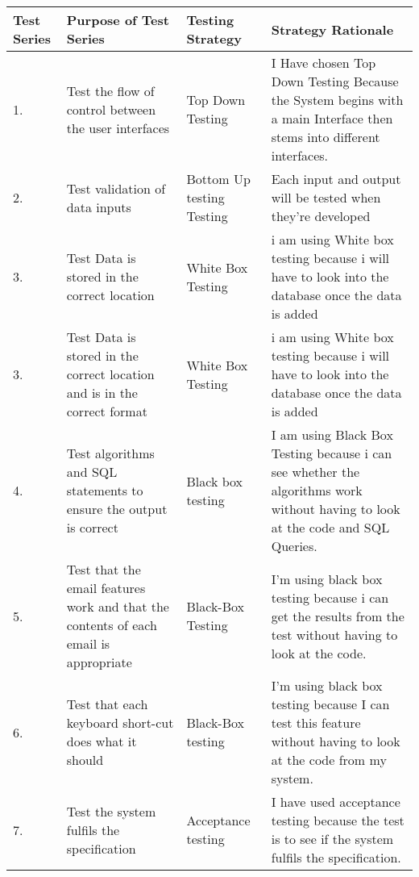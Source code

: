 \begin{landscape}
\begin{center}
    \begin{tabular}{|p{2cm}|p{5cm}|p{5cm}|p{4cm}|}
        \hline
	
	 \textbf{Test Series} & \textbf{Purpose of Test Series} & \textbf{Testing Strategy} & \textbf{Strategy Rationale}\\ \hline
	1. & Test the flow of control between the user interfaces & Top Down Testing & I Have chosen Top Down Testing Because the System begins with a main Interface then stems into different interfaces. \\ \hline
	2. & Test validation of data inputs & Bottom Up testing Testing &  Each input and output will be tested when they're developed\\ \hline
	\rowcolor{dark-grey} 3. & Test Data is stored in the correct location & White Box Testing & i am using White box testing because i will have to look into the database once the data is added \\ \hline
	\rowcolor{light-grey} 3. & Test Data is stored in the correct location and is in the correct format & White Box Testing & i am using White box testing because i will have to look into the database once the data is added \\ \hline
	4. & Test algorithms and SQL statements to ensure the output is correct & Black box testing & I am using Black Box Testing because i can see whether the algorithms work without having to look at the code and SQL Queries. \\ \hline
	\rowcolor{light-grey} 5. & Test that the email features work and that the contents of each email is appropriate & Black-Box Testing & I'm using black box testing because i can get the results from the test without having to look at the code.\\ \hline
	\rowcolor{light-grey} 6. & Test that each keyboard short-cut does what it should & Black-Box testing & I'm using black box testing because I can test this feature without having to look at the code from my system. \\ \hline
	7. & Test the system fulfils the specification & Acceptance testing & I have used acceptance testing because the test is to see if the system fulfils the specification. \\ \hline

    \end{tabular}
\end{center}
\end{landscape}

